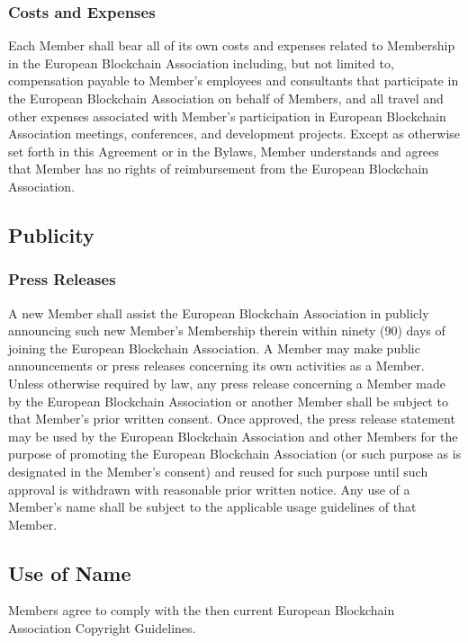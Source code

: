 \documentclass{article}
\begin{document}
\subsubsection{Costs and Expenses}

Each Member shall bear all of its own costs and expenses related to Membership in the European Blockchain Association including, but not limited to, compensation payable to Member’s employees and consultants that participate in the European Blockchain Association on behalf of Members, and all travel and other expenses associated with Member’s participation in European Blockchain Association meetings, conferences, and development projects.
 Except as otherwise set forth in this Agreement or in the Bylaws, Member understands and agrees that Member has no rights of reimbursement from the European Blockchain Association.

\subsection{Publicity}

\subsubsection{Press Releases}

A new Member shall assist the European Blockchain Association in publicly announcing such new Member’s Membership therein within ninety (90) days of joining the European Blockchain Association. 
A Member may make public announcements or press releases concerning its own activities as a Member.
 Unless otherwise required by law, any press release concerning a Member made by the European Blockchain Association or another Member shall be subject to that Member's prior written consent. 
 Once approved, the press release statement may be used by the European Blockchain Association and other Members for the purpose of promoting the European Blockchain Association (or such purpose as is designated in the Member's consent) and reused for such purpose until such approval is withdrawn with reasonable prior written notice. 
 Any use of a Member's name shall be subject to the applicable usage guidelines of that Member.

\subsection{Use of Name}

Members agree to comply with the then current European Blockchain Association Copyright Guidelines.
\end{document}
